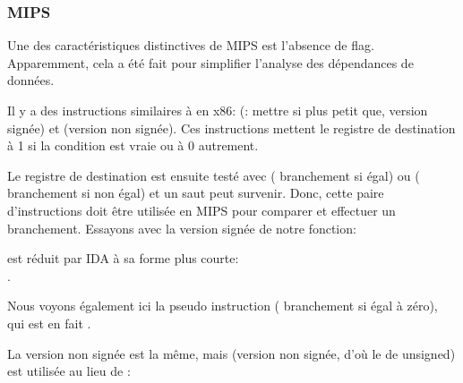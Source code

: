 ﻿\subsubsection{MIPS}

Une des caractéristiques distinctives de MIPS est l'absence de flag. 
Apparemment, cela a été fait pour simplifier l'analyse des dépendances de données.


Il y a des instructions similaires à  en x86:  (:
mettre si plus petit que, version signée) et  (version non signée).
Ces instructions mettent le registre de destination à 1 si la condition est vraie
ou à 0 autrement.


Le registre de destination est ensuite testé avec  (
branchement si égal) ou  ( branchement si non égal)
et un saut peut survenir.
Donc, cette paire d'instructions doit être utilisée en MIPS pour comparer et effectuer
un branchement.
Essayons avec la version signée de notre fonction:



 est réduit par IDA à sa forme plus courte:\\
. 

Nous voyons également ici la pseudo instruction  (
branchement si égal à zéro),\\
qui est en fait .


La version non signée est la même, mais  (version non signée, d'où
le  de unsigned) est utilisée au lieu de :



